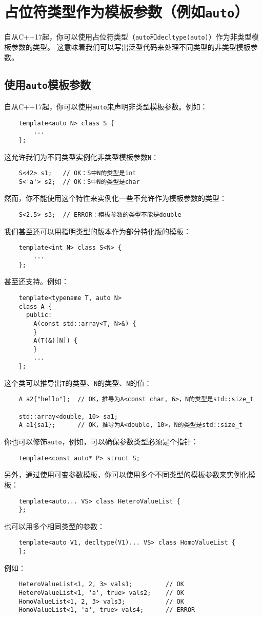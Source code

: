 \section{占位符类型作为模板参数（例如\texttt{auto}）}\label{ch13}
自从C++17起，你可以使用占位符类型（\texttt{auto}和\texttt{decltype(auto)}）作为非类型模板参数的类型。
这意味着我们可以写出泛型代码来处理不同类型的非类型模板参数。

\subsection{使用\texttt{auto}模板参数}\label{ch13.1}
自从C++17起，你可以使用\texttt{auto}来声明非类型模板参数。例如：
\begin{lstlisting}
    template<auto N> class S {
        ...
    };
\end{lstlisting}
这允许我们为不同类型实例化非类型模板参数\texttt{N}：
\begin{lstlisting}
    S<42> s1;   // OK：S中N的类型是int
    S<'a'> s2;  // OK：S中N的类型是char
\end{lstlisting}
然而，你不能使用这个特性来实例化一些不允许作为模板参数的类型：
\begin{lstlisting}
    S<2.5> s3;  // ERROR：模板参数的类型不能是double
\end{lstlisting}
我们甚至还可以用指明类型的版本作为部分特化版的模板：
\begin{lstlisting}
    template<int N> class S<N> {
        ...
    };
\end{lstlisting}
甚至还支持。例如：
\begin{lstlisting}
    template<typename T, auto N>
    class A {
      public:
        A(const std::array<T, N>&) {
        }
        A(T(&)[N]) {
        }
        ...
    };
\end{lstlisting}
这个类可以推导出\texttt{T}的类型、\texttt{N}的类型、\texttt{N}的值：
\begin{lstlisting}
    A a2{"hello"};  // OK，推导为A<const char, 6>，N的类型是std::size_t

    std::array<double, 10> sa1;
    A a1{sa1};      // OK，推导为A<double, 10>，N的类型是std::size_t
\end{lstlisting}
你也可以修饰\texttt{auto}，例如，可以确保参数类型必须是个指针：
\begin{lstlisting}
    template<const auto* P> struct S;
\end{lstlisting}
另外，通过使用可变参数模板，你可以使用多个不同类型的模板参数来实例化模板：
\begin{lstlisting}
    template<auto... VS> class HeteroValueList {
    };
\end{lstlisting}
也可以用多个相同类型的参数：
\begin{lstlisting}
    template<auto V1, decltype(V1)... VS> class HomoValueList {
    };
\end{lstlisting}
例如：
\begin{lstlisting}
    HeteroValueList<1, 2, 3> vals1;         // OK
    HeteroValueList<1, 'a', true> vals2;    // OK
    HomoValueList<1, 2, 3> vals3;           // OK
    HomoValueList<1, 'a', true> vals4;      // ERROR
\end{lstlisting}

